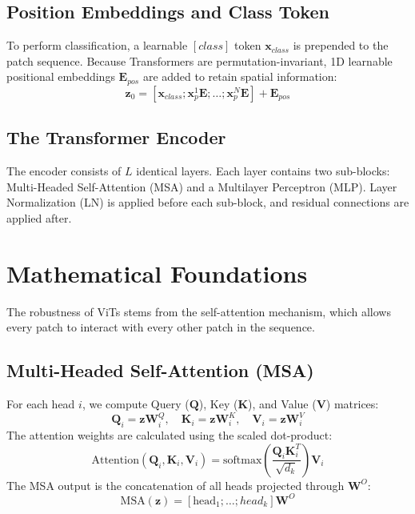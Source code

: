 \documentclass[twocolumn,10pt]{article}
\begin{document}
\subsection{Position Embeddings and Class Token}
To perform classification, a learnable $[class]$ token $\mathbf{x}_{class}$ is prepended to the patch sequence. Because Transformers are permutation-invariant, 1D learnable positional embeddings $\mathbf{E}_{pos}$ are added to retain spatial information:
\begin{equation}
\mathbf{z}_0 = [\mathbf{x}_{class}; \mathbf{x}_p^1\mathbf{E}; \dots; \mathbf{x}_p^N\mathbf{E}] + \mathbf{E}_{pos}
\end{equation}

\subsection{The Transformer Encoder}
The encoder consists of $L$ identical layers. Each layer contains two sub-blocks: Multi-Headed Self-Attention (MSA) and a Multilayer Perceptron (MLP). Layer Normalization (LN) is applied before each sub-block, and residual connections are applied after.

\section{Mathematical Foundations}
The robustness of ViTs stems from the self-attention mechanism, which allows every patch to interact with every other patch in the sequence.

\subsection{Multi-Headed Self-Attention (MSA)}
For each head $i$, we compute Query ($\mathbf{Q}$), Key ($\mathbf{K}$), and Value ($\mathbf{V}$) matrices:
\begin{equation}
\mathbf{Q}_i = \mathbf{z}\mathbf{W}_i^Q, \quad \mathbf{K}_i = \mathbf{z}\mathbf{W}_i^K, \quad \mathbf{V}_i = \mathbf{z}\mathbf{W}_i^V
\end{equation}
The attention weights are calculated using the scaled dot-product:
\begin{equation}
\text{Attention}(\mathbf{Q}_i, \mathbf{K}_i, \mathbf{V}_i) = \text{softmax}\left(\frac{\mathbf{Q}_i\mathbf{K}_i^T}{\sqrt{d_k}}\right)\mathbf{V}_i
\end{equation}
The MSA output is the concatenation of all heads projected through $\mathbf{W}^O$:
\begin{equation}
\text{MSA}(\mathbf{z}) = [\text{head}_1; \dots; head_k]\mathbf{W}^O
\end{equation}
\end{document}
